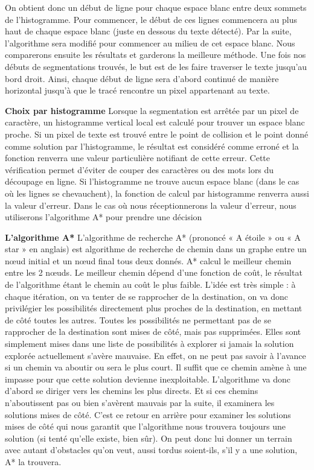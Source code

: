 \documentclass[12pt,a4paper]{article}
\begin{document}
On obtient donc un début de ligne pour chaque espace blanc entre deux sommets de l’histogramme. Pour commencer, le début de ces lignes commencera au plus haut de chaque espace blanc (juste en dessous du texte détecté). Par la suite, l’algorithme sera modifié pour commencer au milieu de cet espace blanc. Nous comparerons ensuite les résultats et garderons la meilleure méthode.\bigbreak
Une fois nos débuts de segmentations trouvés, le but est de les faire traverser le texte jusqu’au bord droit.
Ainsi, chaque début de ligne sera d’abord continué de manière horizontal jusqu’à que le tracé rencontre un pixel appartenant au texte.

\bigbreak\textbf{Choix par histogramme}\bigbreak
Lorsque la segmentation est arrêtée par un pixel de caractère, un histogramme vertical local est calculé pour trouver un espace blanc proche.\bigbreak
Si un pixel de texte est trouvé entre le point de collision et le point donné comme solution par l’histogramme, le résultat est considéré comme erroné et la fonction renverra une valeur particulière notifiant de cette erreur. Cette vérification permet d’éviter de couper des caractères ou des mots lors du découpage en ligne.\bigbreak
Si l’histogramme ne trouve aucun espace blanc (dans le cas où les lignes se chevauchent), la fonction de calcul par histogramme renverra aussi la valeur d’erreur.\bigbreak
Dans le cas où nous réceptionnerons la valeur d’erreur, nous utiliserons l’algorithme A* pour prendre une décision

\newpage\textbf{L'algorithme A*}\bigbreak
L’algorithme de recherche A* (prononcé « A étoile » ou « A star » en anglais) est algorithme de recherche de chemin dans un graphe entre un nœud initial et un nœud final tous deux donnés. A* calcul le meilleur chemin entre les 2 nœuds. Le meilleur chemin dépend d’une fonction de coût, le résultat de l’algorithme étant le chemin au coût le plus faible.\bigbreak
L'idée est très simple : à chaque itération, on va tenter de se rapprocher de la destination, on va donc privilégier les possibilités directement plus proches de la destination, en mettant de côté toutes les autres.\bigbreak
Toutes les possibilités ne permettant pas de se rapprocher de la destination sont mises de côté, mais pas supprimées. Elles sont simplement mises dans une liste de possibilités à explorer si jamais la solution explorée actuellement s'avère mauvaise. En effet, on ne peut pas savoir à l'avance si un chemin va aboutir ou sera le plus court. Il suffit que ce chemin amène à une impasse pour que cette solution devienne inexploitable.\bigbreak
L'algorithme va donc d'abord se diriger vers les chemins les plus directs. Et si ces chemins n'aboutissent pas ou bien s'avèrent mauvais par la suite, il examinera les solutions mises de côté. C'est ce retour en arrière pour examiner les solutions mises de côté qui nous garantit que l'algorithme nous trouvera toujours une solution (si tenté qu'elle existe, bien sûr).\bigbreak
On peut donc lui donner un terrain avec autant d'obstacles qu'on veut, aussi tordus soient-ils, s'il y a une solution, A* la trouvera.\bigbreak
\end{document}
